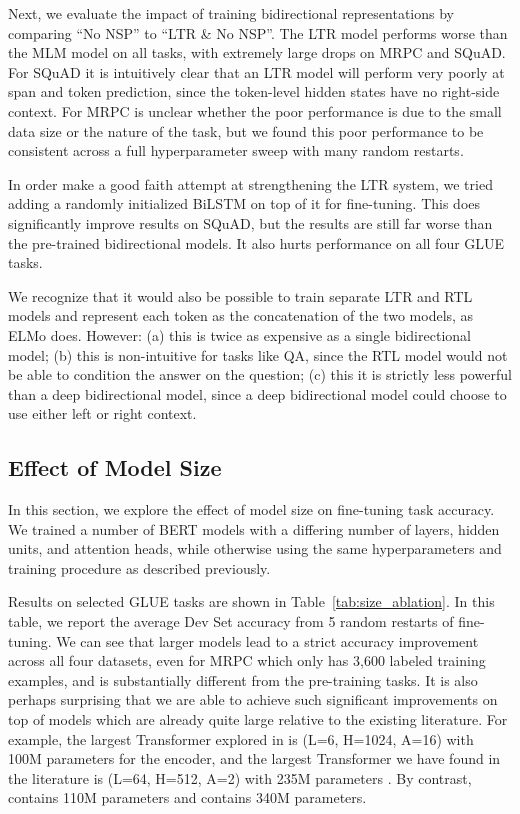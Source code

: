 Next, we evaluate the impact of training bidirectional representations by comparing ``No NSP'' to ``LTR \& No NSP''. The LTR model performs worse than the MLM model on all tasks, with extremely large drops on MRPC and SQuAD. For SQuAD it is intuitively clear that an LTR model will perform very poorly at span and token prediction, since the token-level hidden states have no right-side context. For MRPC is unclear whether the poor performance is due to the small data size or the nature of the task, but we found this poor performance to be consistent across a full hyperparameter sweep with many random restarts.

In order make a good faith attempt at strengthening the LTR system, we tried adding a randomly initialized BiLSTM on top of it for fine-tuning. This does significantly improve results on SQuAD, but the results are still far worse than the pre-trained bidirectional models. It also hurts performance on all four GLUE tasks. 

We recognize that it would also be possible to train separate LTR and RTL models and represent each token as the concatenation of the two models, as ELMo does. However: (a) this is twice as expensive as a single bidirectional model; (b) this is non-intuitive for tasks like QA, since the RTL model would not be able to condition the answer on the question; (c) this it is strictly less powerful than a deep bidirectional model, since a deep bidirectional model could choose to use either left or right context.

\subsection{Effect of Model Size}
\label{sec:model_size_ablation}

In this section, we explore the effect of model size on fine-tuning task accuracy. We trained a number of BERT models with a differing number of layers, hidden units, and attention heads, while otherwise using the same hyperparameters and training procedure as described previously.



Results on selected GLUE tasks are shown in Table~\ref{tab:size_ablation}. In this table, we report the average Dev Set accuracy from 5 random restarts of fine-tuning. We can see that larger models lead to a strict accuracy improvement across all four datasets, even for MRPC which only has 3,600 labeled training examples, and is substantially different from the pre-training tasks. It is also perhaps surprising that we are able to achieve such significant improvements on top of models which are already quite large relative to the existing literature. For example, the largest Transformer explored in \citet{vaswani-etal:2017:_atten} is (L=6, H=1024, A=16) with 100M parameters for the encoder, and the largest Transformer we have found in the literature is (L=64, H=512, A=2) with 235M parameters \cite{alrfou:2018}. By contrast, \bertbase contains 110M parameters and \bertlarge contains 340M parameters.

